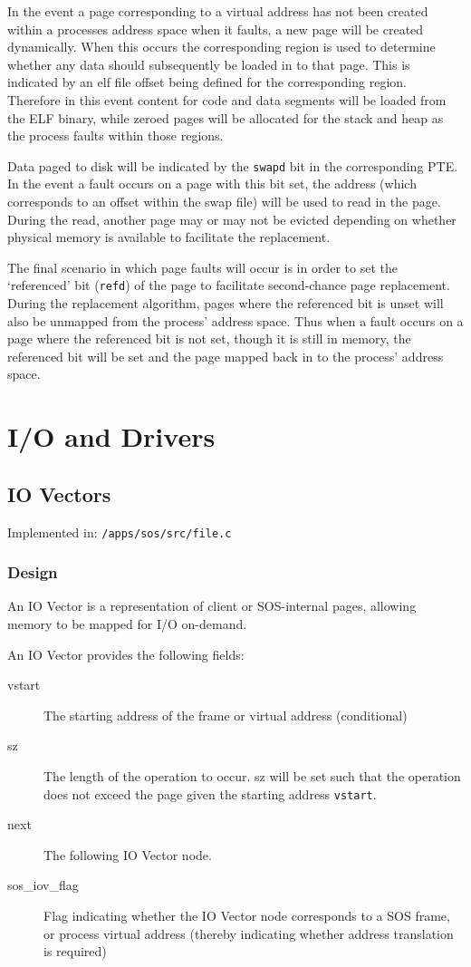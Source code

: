 \documentclass[a4paper,12pt]{article}
\begin{document}
In the event a page corresponding to a virtual address has not been created
within a processes address space when it faults, a new page will be created
dynamically.  When this occurs the corresponding region is used to determine
whether any data should subsequently be loaded in to that page.  This is
indicated by an elf file offset being defined for the corresponding region.
Therefore in this event content for code and data segments will be loaded from
the ELF binary, while zeroed pages will be allocated for the stack and heap as
the process faults within those regions.

Data paged to disk will be indicated by the \texttt{swapd} bit in the corresponding
PTE.  In the event a fault occurs on a page with this bit set, the address
(which corresponds to an offset within the swap file) will be used to read in
the page.  During the read, another page may or may not be evicted depending
on whether physical memory is available to facilitate the replacement.

The final scenario in which page faults will occur is in order to set the
`referenced' bit (\texttt{refd}) of the page to facilitate second-chance page
replacement.  During the replacement algorithm, pages where the referenced bit
is unset will also be unmapped from the process' address space.  Thus when a
fault occurs on a page where the referenced bit is not set, though it is still
in memory, the referenced bit will be set and the page mapped back in to the
process' address space.

\section{I/O and Drivers}
\subsection{IO Vectors}
Implemented in: \texttt{/apps/sos/src/file.c}

\subsubsection{Design}
An IO Vector is a representation of client or SOS-internal pages, allowing
memory to be mapped for I/O on-demand.

An IO Vector provides the following fields:
\begin{description}
\item[vstart] The starting address of the frame or virtual address (conditional)
\item[sz] The length of the operation to occur.  sz will be set such that the
  operation does not exceed the page given the starting address \texttt{vstart}.
\item[next] The following IO Vector node.
\item[sos\_iov\_flag] Flag indicating whether the IO Vector node corresponds to
  a SOS frame, or process virtual address (thereby indicating whether
  address translation is required)
\end{description}
\end{document}
